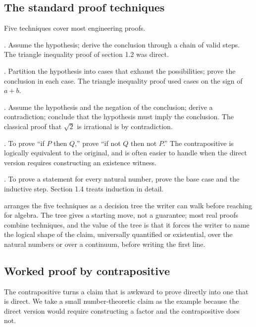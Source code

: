 \subsection{The standard proof techniques}

Five techniques cover most engineering proofs.

. Assume the hypothesis; derive the conclusion
through a chain of valid steps. The triangle inequality proof of
section 1.2 was direct.

. Partition the hypothesis into cases that
exhaust the possibilities; prove the conclusion in each case. The
triangle inequality proof used cases on the sign of $a + b$.

. Assume the hypothesis and the
negation of the conclusion; derive a contradiction; conclude that the
hypothesis must imply the conclusion. The classical proof that
$\sqrt{2}$ is irrational is by contradiction.

. To prove ``if $P$ then $Q$,''
prove ``if not $Q$ then not $P$.'' The contrapositive is logically
equivalent to the original, and is often easier to handle when the
direct version requires constructing an existence witness.

. To prove a statement for every natural
number, prove the base case and the inductive step. Section 1.4
treats induction in detail.



 arranges the five techniques as
a decision tree the writer can walk before reaching for algebra. The
tree gives a starting move, not a guarantee; most real proofs combine
techniques, and the value of the tree is that it forces the writer to
name the logical shape of the claim, universally quantified or
existential, over the natural numbers or over a continuum, before
writing the first line.

\subsection{Worked proof by contrapositive}

The contrapositive turns a claim that is awkward to prove directly
into one that is direct. We take a small number-theoretic claim as the
example because the direct version would require constructing a factor
and the contrapositive does not.

